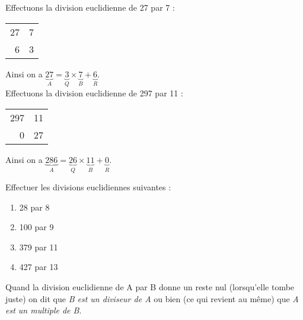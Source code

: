 \documentclass[a4paper,12pt,french]{book}
\begin{document}
\begin{exemple}[s]
	Effectuons la division euclidienne de 27 par 7 :
		\begin{center}
		\begin{tabular}{r|l}
			27 & 7\\
			\cline{2-2}
			6 & 3
		\end{tabular}
		\end{center}
	Ainsi on a $\displaystyle\underbrace{27}_{A}=\underbrace{3}_{Q}\times \underbrace{7}_{B}+\underbrace{6}_{R}$.\\[3em]
	
	Effectuons la division euclidienne de 297 par 11 :
	\begin{center}
		\begin{tabular}{r|l}
			297 & 11\\
			\cline{2-2}
			0 & 27
		\end{tabular}
	\end{center}
	Ainsi on a $\displaystyle\underbrace{286}_{A}=\underbrace{26}_{Q}\times \underbrace{11}_{B}+\underbrace{0}_{R}$.
\end{exemple}

\begin{exercice}[]
	Effectuer les divisions euclidiennes suivantes :
	\begin{multicols}{4}
		\begin{enumerate}[\bfseries a.]
			\item 	28 par 8
			\item 	100 par 9
			\item 	379 par 11
			\item 	427 par 13\\
		\end{enumerate}
	\end{multicols}
\end{exercice}



\begin{definition}
	Quand la division euclidienne de A par B donne un reste nul (lorsqu'elle tombe juste) on dit que \emph{B est un diviseur de A} ou bien (ce qui revient au même) que \emph{A est un multiple de B}.
\end{definition}
\end{document}
